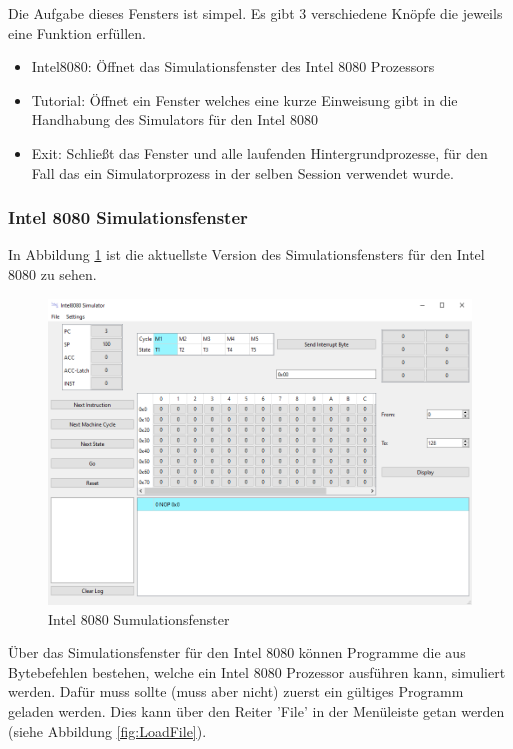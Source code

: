 \documentclass[12pt]{article}
\newcommand{\imgSpaceBefore}{\vspace{10pt}}
\begin{document}
\noindent
Die Aufgabe dieses Fensters ist simpel. Es gibt 3 verschiedene Knöpfe die jeweils eine Funktion erfüllen.
\begin{itemize}
	\item Intel8080: Öffnet das Simulationsfenster des Intel 8080 Prozessors
	\item Tutorial: Öffnet ein Fenster welches eine kurze Einweisung gibt in die Handhabung des Simulators für den Intel 8080
	\item Exit: Schließt das Fenster und alle laufenden Hintergrundprozesse, für den Fall das ein Simulatorprozess in der selben Session verwendet wurde.
\end{itemize}

\subsubsection{Intel 8080 Simulationsfenster}
In Abbildung \ref{fig:I8080MW} ist die aktuellste Version des Simulationsfensters für den Intel 8080 zu sehen.\imgSpaceBefore

\begin{figure}[H]
\centering
\includegraphics[width=15cm]{bilder/Intel8080_MainWindow}
\caption{Intel 8080 Sumulationsfenster}
\label{fig:I8080MW}
\end{figure}

\noindent
Über das Simulationsfenster für den Intel 8080 können Programme die aus Bytebefehlen bestehen, welche ein Intel 8080 Prozessor ausführen kann, simuliert werden. Dafür muss sollte (muss aber nicht) zuerst ein gültiges Programm geladen werden. Dies kann über den Reiter 'File' in der Menüleiste getan werden (siehe Abbildung \ref{fig:LoadFile}).\imgSpaceBefore
\end{document}

